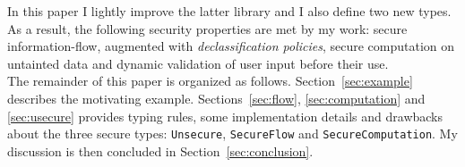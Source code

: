 In this paper I lightly improve the latter library and I also define two new types. As a result, the following security properties are met by my work: secure information-flow, augmented with \textit{declassification policies}, secure computation on untainted data and dynamic validation of user input before their use. \\
The remainder of this paper is organized as follows. Section~\ref{sec:example} describes the motivating example. Sections~\ref{sec:flow}, \ref{sec:computation} and \ref{sec:usecure} provides typing rules, some implementation details and drawbacks about the three secure types: \texttt{Unsecure}, \texttt{SecureFlow} and \texttt{SecureComputation}. My discussion is then concluded in Section~\ref{sec:conclusion}.